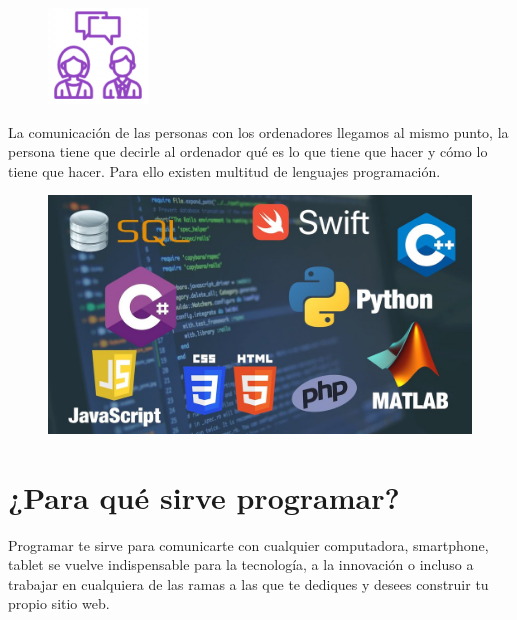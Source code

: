 \documentclass{article}
\begin{document}
\begin{figure}[h!]
\centering
\includegraphics[scale=0.9]{hablar.png}
\end{figure}

\begin{center}

   \large La comunicación de las personas con los ordenadores llegamos al mismo punto, la persona tiene que decirle al ordenador qué es lo que tiene que hacer y cómo lo tiene que hacer. Para ello existen multitud de lenguajes programación.
\end{center}

\begin{figure}[h!]
\centering
\includegraphics[scale=0.26]{eje.jpg}\\[1cm]
\end{figure}
 
\section{¿Para qué sirve programar?} 
\large
 Programar te sirve para comunicarte con cualquier computadora, smartphone, tablet se vuelve indispensable para la tecnología, a la innovación o incluso a trabajar en cualquiera de las ramas a las que te dediques y desees construir tu propio sitio web. 
 
\end{document}

